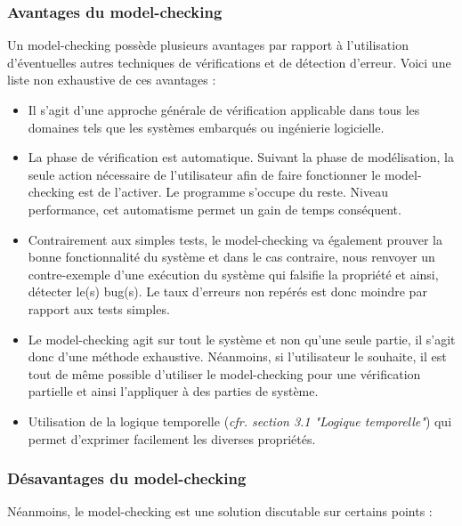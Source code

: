 \documentclass[runningheads,a4paper,10pt]{llncs}
\begin{document}
\subsubsection{Avantages du model-checking}

Un model-checking possède plusieurs avantages par rapport à l'utilisation d'éventuelles autres techniques de vérifications et de détection d'erreur. Voici une liste non exhaustive de ces avantages : 

\begin{itemize}
\item Il s'agit d'une approche générale de vérification applicable dans tous les domaines tels que les systèmes embarqués ou ingénierie logicielle. 
\item La phase de vérification est automatique. Suivant la phase de modélisation, la seule action nécessaire de l'utilisateur afin de faire fonctionner le model-checking est de l'activer. Le programme s'occupe du reste. Niveau performance, cet automatisme permet un gain de temps conséquent. 
\item Contrairement aux simples tests, le model-checking va également prouver la bonne fonctionnalité du système et dans le cas contraire, nous renvoyer un contre-exemple d'une exécution du système qui falsifie la propriété et ainsi, détecter le(s) bug(s). Le taux d'erreurs non repérés est donc moindre par rapport aux tests simples. 
\item Le model-checking agit sur tout le système et non qu'une seule partie, il s'agit donc d'une méthode exhaustive. Néanmoins, si l'utilisateur le souhaite, il est tout de même possible d'utiliser le model-checking pour une vérification partielle et ainsi l'appliquer à des parties de système. 
\item Utilisation de la logique temporelle (\textit{cfr. section 3.1 "Logique temporelle"}) qui permet d'exprimer facilement les diverses propriétés. 
\end{itemize}

\subsubsection{Désavantages du model-checking}

Néanmoins, le model-checking est une solution discutable sur certains points : 
\end{document}
